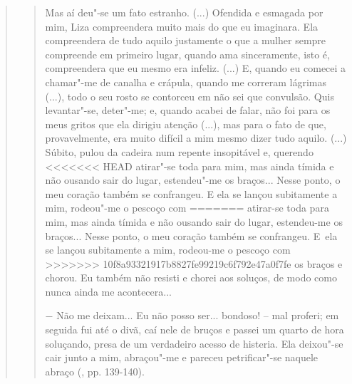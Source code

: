 {\begin{quote}
\begin{quote}
Mas aí deu"-se um fato estranho. (...) Ofendida e esmagada por mim, Liza
compreendera muito mais do que eu imaginara. Ela compreendera de tudo
aquilo justamente o que a mulher sempre compreende em primeiro lugar,
quando ama sinceramente, isto é, compreendera que eu mesmo era infeliz.
(...) E, quando eu comecei a chamar"-me de canalha e crápula, quando me
correram lágrimas (...), todo o seu rosto se contorceu em não sei que
convulsão. Quis levantar"-se, deter"-me; e, quando acabei de falar, não
foi para os meus gritos que ela dirigiu atenção (...), mas para o fato
de que, provavelmente, era muito difícil a mim mesmo dizer tudo aquilo.
(...) Súbito, pulou da cadeira num repente insopitável e, querendo
<<<<<<< HEAD
atirar"-se toda para mim, mas ainda tímida e não ousando sair do lugar,
estendeu"-me os braços... Nesse ponto, o meu coração também se
confrangeu. E ela se lançou subitamente a mim, rodeou"-me o pescoço com
=======
atirar-se toda para mim, mas ainda tímida e não ousando sair do lugar,
estendeu-me os braços... Nesse ponto, o meu coração também se
confrangeu. E~ela se lançou subitamente a mim, rodeou-me o pescoço com
>>>>>>> 10f8a93321917b8827fe99219c6f792e47a0f7fe
os braços e chorou. Eu também não resisti e chorei aos soluços, de modo
como nunca ainda me acontecera...

− Não me deixam... Eu não posso ser... bondoso! -- mal proferi; em
seguida fui até o divã, caí nele de bruços e passei um quarto de hora
soluçando, presa de um verdadeiro acesso de histeria. Ela deixou"-se cair
junto a mim, abraçou"-me e pareceu petrificar"-se naquele abraço (,
pp. 139-140).
\end{quote}


\end{quote}}
